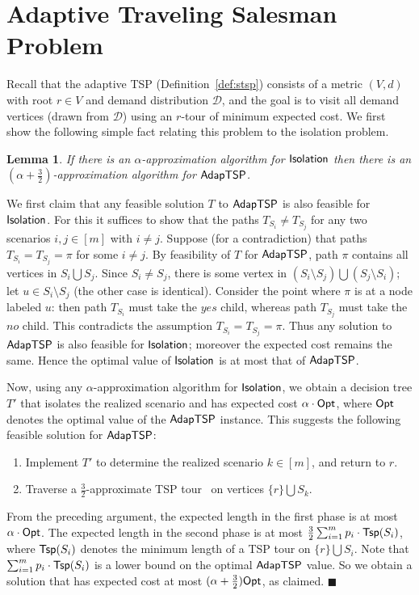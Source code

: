 \documentclass[11pt]{article}
\newtheorem{lemma}[thm]{Lemma}
\def\opt{{\sf Opt}\xspace}
\def\tsp{{\sf Tsp}\xspace}
\def\ds{\mathcal{D}}
\def\isoprob{\ensuremath{{\sf Isolation}}\xspace}
\def\stsp{\ensuremath{{\sf AdapTSP}}\xspace}
\newenvironment{pf}{

\noindent{\bf Proof:}} {\hfill$\blacksquare$


}
\begin{document}
\section{Adaptive Traveling Salesman Problem}\label{sec:stsp}


Recall that the adaptive TSP (Definition~\ref{def:stsp}) 
consists of a metric $(V,d)$ with root $r\in V$ and demand distribution $\ds$, and the goal  is to visit all demand vertices (drawn from $\ds$) using an $r$-tour of minimum  expected cost.   We first show the following simple fact relating this problem to the isolation problem.


\begin{lemma}
  \label{lem:reduce-to-isol}
If there is an $\alpha$-approximation algorithm for \isoprob then there is an
  $\left(\alpha+\frac32\right)$-approximation algorithm for \stsp.
\end{lemma}
\begin{pf}
We first claim that any feasible solution $T$ to \stsp is also feasible for \isoprob. For this it suffices to show that
the paths $T_{S_i}\ne T_{S_j}$ for any two scenarios $i,j\in[m]$ with $i\ne j$. Suppose (for a contradiction) that paths
$T_{S_i}=T_{S_j}=\pi$ for some $i\ne j$. By feasibility of $T$ for \stsp, path $\pi$ contains all vertices in
$S_i\bigcup S_j$. Since $S_i\ne S_j$, there is some vertex in $(S_i\setminus S_j)\bigcup (S_j\setminus S_i)$; let $u\in
S_i\setminus S_j$ (the other case is identical). Consider the point where $\pi$ is at a node labeled $u$: then path
$T_{S_i}$ must take the $yes$ child, whereas path $T_{S_j}$ must take the $no$ child. This contradicts the assumption
$T_{S_i}=T_{S_j}=\pi$. Thus any solution to \stsp is also feasible for \isoprob; moreover the expected cost remains the
same. Hence the optimal value of \isoprob is at most that of \stsp.


Now, using any $\alpha$-approximation algorithm for \isoprob, we obtain a decision tree $T'$ that isolates the realized scenario and
has expected cost $\alpha \cdot \opt$,  where $\opt$ denotes the optimal value of the \stsp instance. This suggests the
following feasible solution for \stsp:
\begin{enumerate}
 \item Implement $T'$ to determine the realized scenario $k\in [m]$, and return to $r$.
 \item Traverse a $\frac32$-approximate TSP tour~\cite{c} on vertices $\{r\}\bigcup S_k$.
\end{enumerate}
From the preceding argument, the expected length in the first phase is at most $\alpha\cdot \opt$. The expected length
in the second phase is at most $\frac32 \sum_{i=1}^m p_i\cdot \tsp(S_i)$, where $\tsp(S_i)$ denotes the minimum length
of a TSP tour on $\{r\}\bigcup S_i$. Note that $\sum_{i=1}^m p_i\cdot \tsp(S_i)$ is a lower bound on the optimal \stsp
value. So we obtain a solution that has expected cost at most $(\alpha + \frac32) \opt$, as claimed.
\end{pf}
\end{document}
